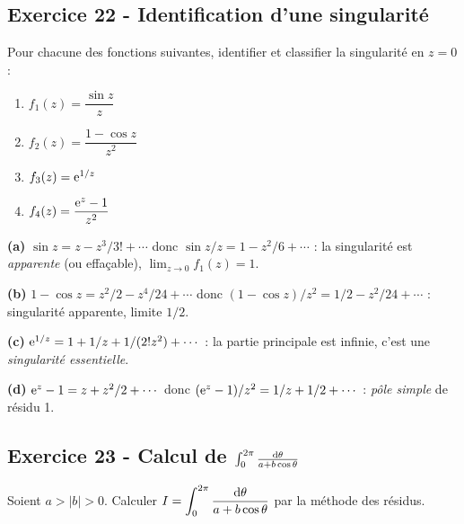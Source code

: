 \documentclass[12pt,a4paper]{article}
\begin{document}
\subsection*{Exercice 22 - Identification d'une singularité \niveau{\moyen}}

\begin{boiteexercice}
Pour chacune des fonctions suivantes, identifier et classifier la singularité en $z=0$ :
\begin{enumerate}[label=(\alph*)]
  \item $f_1(z) = \dfrac{\sin z}{z}$
  \item $f_2(z) = \dfrac{1-\cos z}{z^2}$
  \item $f_3(z) = \mathrm{e}^{1/z}$
  \item $f_4(z) = \dfrac{\mathrm{e}^z - 1}{z^2}$
\end{enumerate}
\end{boiteexercice}

\begin{boitecorrige}
\textbf{(a)} $\sin z = z - z^3/3! + \cdots$ donc $\sin z / z = 1 - z^2/6 + \cdots$ : la singularité est \emph{apparente} (ou effa\c{c}able), $\lim_{z\to 0}f_1(z) = 1$.

\textbf{(b)} $1 - \cos z = z^2/2 - z^4/24 + \cdots$ donc $(1-\cos z)/z^2 = 1/2 - z^2/24 + \cdots$ : singularité apparente, limite $1/2$.

\textbf{(c)} $\mathrm{e}^{1/z} = 1 + 1/z + 1/(2!z^2) + \cdots$ : la partie principale est infinie, c'est une \emph{singularité essentielle}.

\textbf{(d)} $\mathrm{e}^z - 1 = z + z^2/2 + \cdots$ donc $(\mathrm{e}^z-1)/z^2 = 1/z + 1/2 + \cdots$ : \emph{pôle simple} de résidu 1.
\end{boitecorrige}

\subsection*{Exercice 23 - Calcul de $\int_0^{2\pi}\frac{\mathrm{d}\theta}{a+b\cos\theta}$ \niveau{\difficile}}

\begin{boiteexercice}
Soient $a > |b| > 0$. Calculer $I = \displaystyle\int_0^{2\pi}\frac{\mathrm{d}\theta}{a+b\cos\theta}$ par la méthode des résidus.
\end{boiteexercice}
\end{document}
